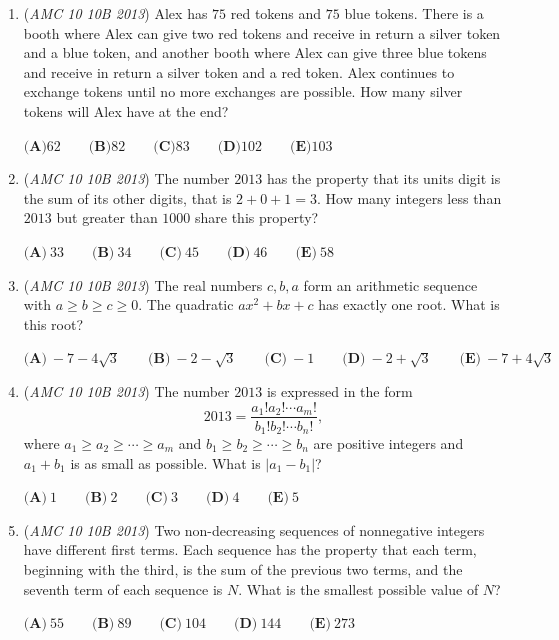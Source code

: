 \begin{enumerate}
	\item (\textit{AMC 10 10B 2013}) Alex has $75$ red tokens and $75$ blue tokens. There is a booth where Alex can give two red tokens and receive in return a silver token and a blue token, and another booth where Alex can give three blue tokens and receive in return a silver token and a red token. Alex continues to exchange tokens until no more exchanges are possible. How many silver tokens will Alex have at the end?


 $\textbf{(A)} 62 \qquad \textbf{(B)} 82 \qquad \textbf{(C)} 83 \qquad \textbf{(D)} 102 \qquad \textbf{(E)} 103$


	\item (\textit{AMC 10 10B 2013}) The number $2013$ has the property that its units digit is the sum of its other digits, that is $2+0+1=3$. How many integers less than $2013$ but greater than $1000$ share this property?


 $\textbf{(A)}\ 33\qquad\textbf{(B)}\ 34\qquad\textbf{(C)}\ 45\qquad\textbf{(D)}\ 46\qquad\textbf{(E)}\ 58$


	\item (\textit{AMC 10 10B 2013}) The real numbers $c,b,a$ form an arithmetic sequence with $a\ge b\ge c\ge 0$. The quadratic $ax^2+bx+c$ has exactly one root. What is this root?


 $\textbf{(A)}\ -7-4\sqrt{3}\qquad\textbf{(B)}\ -2-\sqrt{3}\qquad\textbf{(C)}\ -1\qquad\textbf{(D)}\ -2+\sqrt{3}\qquad\textbf{(E)}\ -7+4\sqrt{3}$


	\item (\textit{AMC 10 10B 2013}) The number $2013$ is expressed in the form 
 \[2013=\frac{a_1!a_2!\cdots a_m!}{b_1!b_2!\cdots b_n!},\] where $a_1\ge a_2\ge\cdots\ge a_m$ and $b_1\ge b_2\ge\cdots\ge b_n$ are positive integers and $a_1+b_1$ is as small as possible. What is $|a_1-b_1|$?


 $\textbf{(A)}\ 1\qquad\textbf{(B)}\ 2\qquad\textbf{(C)}\ 3\qquad\textbf{(D)}\ 4\qquad\textbf{(E)}\ 5$


	\item (\textit{AMC 10 10B 2013}) Two non-decreasing sequences of nonnegative integers have different first terms.  Each sequence has the property that each term, beginning with the third, is the sum of the previous two terms, and the seventh term of each sequence is $N$.  What is the smallest possible value of $N$?


 $\textbf{(A)}\ 55 \qquad\textbf{(B)}\ 89  \qquad\textbf{(C)}\ 104 \qquad\textbf{(D)}\ 144 \qquad\textbf{(E)}\ 273$



\end{enumerate}
